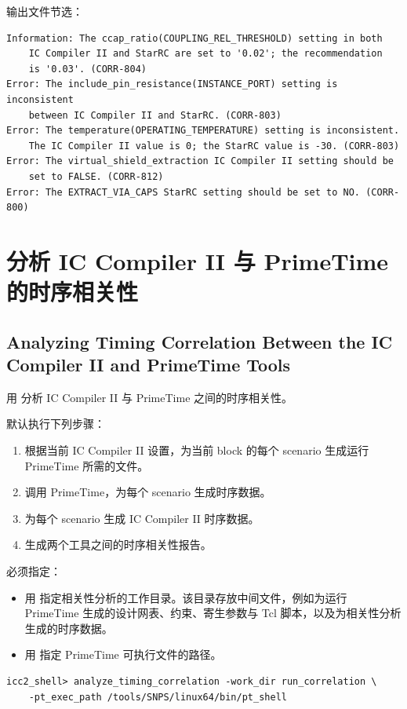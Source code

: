 输出文件节选：
\begin{lstlisting}
Information: The ccap_ratio(COUPLING_REL_THRESHOLD) setting in both
    IC Compiler II and StarRC are set to '0.02'; the recommendation
    is '0.03'. (CORR-804)
Error: The include_pin_resistance(INSTANCE_PORT) setting is inconsistent
    between IC Compiler II and StarRC. (CORR-803)
Error: The temperature(OPERATING_TEMPERATURE) setting is inconsistent.
    The IC Compiler II value is 0; the StarRC value is -30. (CORR-803)
Error: The virtual_shield_extraction IC Compiler II setting should be
    set to FALSE. (CORR-812)
Error: The EXTRACT_VIA_CAPS StarRC setting should be set to NO. (CORR-800)
\end{lstlisting}

\section{分析 IC Compiler II 与 PrimeTime 的时序相关性}
\subsection*{Analyzing Timing Correlation Between the IC Compiler II and PrimeTime Tools}

用  分析 IC Compiler II 与 PrimeTime 之间的时序相关性。

默认执行下列步骤：
\begin{enumerate}
  \item 根据当前 IC Compiler II 设置，为当前 block 的每个 scenario 生成运行 PrimeTime 所需的文件。
  \item 调用 PrimeTime，为每个 scenario 生成时序数据。
  \item 为每个 scenario 生成 IC Compiler II 时序数据。
  \item 生成两个工具之间的时序相关性报告。
\end{enumerate}

必须指定：
\begin{itemize}
  \item 用  指定相关性分析的工作目录。该目录存放中间文件，例如为运行 PrimeTime 生成的设计网表、约束、寄生参数与 Tcl 脚本，以及为相关性分析生成的时序数据。
  \item 用  指定 PrimeTime 可执行文件的路径。
\end{itemize}
\begin{lstlisting}
icc2_shell> analyze_timing_correlation -work_dir run_correlation \
    -pt_exec_path /tools/SNPS/linux64/bin/pt_shell
\end{lstlisting}

